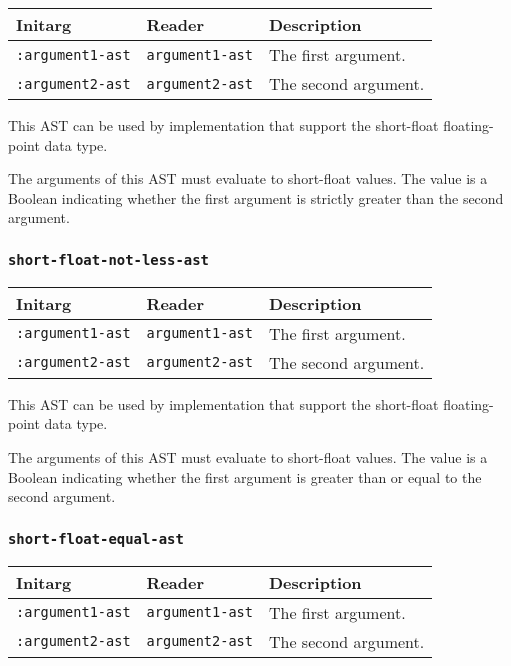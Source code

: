 \begin{tabular}{|l|l|l|}
\hline
Initarg & Reader & Description\\
\hline\hline
\texttt{:argument1-ast} & \texttt{argument1-ast} & The first argument.\\
\hline
\texttt{:argument2-ast} & \texttt{argument2-ast} & The second argument.\\
\hline
\end{tabular}

This AST can be used by implementation that support the short-float
floating-point data type.  

The arguments of this AST must evaluate to short-float
values.  The value is a Boolean indicating whether the first argument
is strictly greater than the second argument.

\subsubsection{\texttt{short-float-not-less-ast}}
\label{sec-ast-short-float-not-less}

\begin{tabular}{|l|l|l|}
\hline
Initarg & Reader & Description\\
\hline\hline
\texttt{:argument1-ast} & \texttt{argument1-ast} & The first argument.\\
\hline
\texttt{:argument2-ast} & \texttt{argument2-ast} & The second argument.\\
\hline
\end{tabular}

This AST can be used by implementation that support the short-float
floating-point data type.  

The arguments of this AST must evaluate to short-float
values.  The value is a Boolean indicating whether the first argument
is greater than or equal to the second argument.

\subsubsection{\texttt{short-float-equal-ast}}
\label{sec-ast-short-float-equal}

\begin{tabular}{|l|l|l|}
\hline
Initarg & Reader & Description\\
\hline\hline
\texttt{:argument1-ast} & \texttt{argument1-ast} & The first argument.\\
\hline
\texttt{:argument2-ast} & \texttt{argument2-ast} & The second argument.\\
\hline
\end{tabular}

